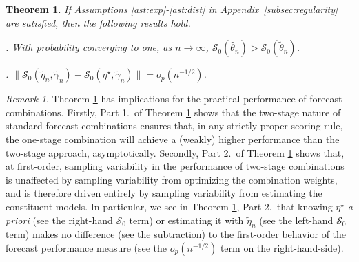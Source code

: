 \documentclass[12pt]{article}
\newtheorem{theorem}{Theorem}
\theoremstyle{definition}
\theoremstyle{remark}
\newtheorem{remark}{Remark}
\renewcommand{\appendixname}{Appendix}
\begin{document}
\begin{theorem}
\label{thm:one} If Assumptions \ref{ast:exp}-\ref{ast:dist} in \appendixname\ \ref{subsec:regularity} are satisfied, then the following results hold.

\smallskip

. With probability converging to one, as $n\rightarrow\infty$, $\mathcal{S}_0(\hat\theta_n) > \mathcal{S}_0(\tilde\theta_n)$.

\smallskip

. $\|\mathcal{S}_0(\tilde{\eta}_{n}, \tilde{\gamma}_{n}) - \mathcal{S}_0(\eta^{\star}, \tilde{\gamma}_{n}) \| = o_p(n^{-1/2})$.

\end{theorem}

\begin{remark}
\label{rmk:oracle} Theorem \ref{thm:one} has implications for the practical performance of forecast combinations. Firstly, Part 1.\ of Theorem \ref{thm:one} shows that the two-stage nature of standard forecast combinations ensures that, in any strictly proper scoring rule, the one-stage combination will achieve a (weakly) higher performance than the two-stage approach, asymptotically. Secondly, Part 2.\ of Theorem \ref{thm:one} shows that, at first-order, sampling variability in the performance of two-stage combinations is unaffected by sampling variability from optimizing the combination weights, and is therefore driven entirely by sampling variability from estimating the constituent models. In particular, we see in Theorem \ref{thm:one}, Part 2.\ that knowing $\eta ^{\star }$ \textit{a priori} (see the right-hand $\mathcal{S}_{0}$ term) or estimating it with $\tilde{\eta}_{n}$ (see the left-hand $\mathcal{S}_{0}$ term) makes no difference (see the subtraction) to the first-order behavior of the forecast performance measure (see the $o_{p}(n^{-1/2})$ term on the right-hand-side).
\end{remark}
\end{document}
